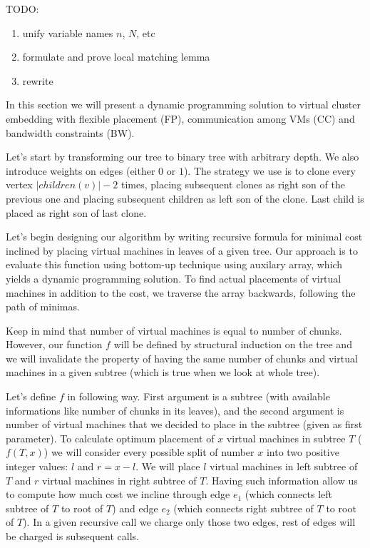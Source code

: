 TODO:
\begin{enumerate}
  \item unify variable names $n$, $N$, etc
  \item formulate and prove local matching lemma
  \item rewrite
\end{enumerate}


In this section we will present a dynamic programming solution to
virtual cluster embedding with flexible placement (FP), communication
among VMs (CC) and bandwidth constraints (BW).

Let's start by transforming our tree to binary tree with arbitrary
depth. We also introduce weights on edges (either $0$ or $1$). The
strategy we use is to clone every vertex $|children(v)| - 2$ times,
placing subsequent clones as right son of the previous one and placing
subsequent children as left son of the clone. Last child is placed as
right son of last clone.

Let's begin designing our algorithm by writing recursive formula for
minimal cost inclined by placing virtual machines in leaves of a given
tree. Our approach is to evaluate this function using bottom-up
technique using auxilary array, which yields a dynamic programming
solution. To find actual placements of virtual machines in addition to
the cost, we traverse the array backwards, following the path of
minimas.

Keep in mind that number of virtual machines is equal to number of
chunks. However, our function $f$ will be defined by structural
induction on the tree and we will invalidate the property of having
the same number of chunks and virtual machines in a given subtree (which is true when
we look at whole tree).

Let's define $f$ in following way. First argument is a subtree (with
available informations like number of chunks in its leaves), and the
second argument is number of virtual machines that we decided to place
in the subtree (given as first parameter). To calculate optimum
placement of $x$ virtual machines in subtree $T$ ($f(T, x)$) we will
consider every possible split of number $x$ into two positive integer
values: $l$ and $r = x - l$. We will place $l$ virtual machines in
left subtree of $T$ and $r$ virtual machines in right subtree of
$T$. Having such information allow us to compute how much cost we
incline through edge $e_1$ (which connects left subtree of $T$ to root
of $T$) and edge $e_2$ (which connects right subtree of $T$ to root of
$T$). In a given recursive call we charge only those two edges, rest
of edges will be charged is subsequent calls.

